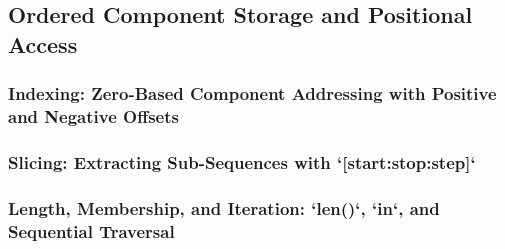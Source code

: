 \subsection{Ordered Component Storage and Positional Access}
\subsubsection{Indexing: Zero-Based Component Addressing with Positive and Negative Offsets}
\subsubsection{Slicing: Extracting Sub-Sequences with `[start:stop:step]`}
\subsubsection{Length, Membership, and Iteration: `len()`, `in`, and Sequential Traversal}
